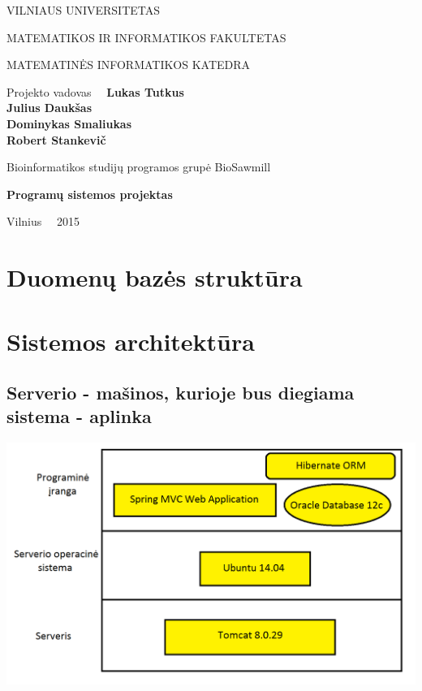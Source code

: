 \documentclass[a4paper,12pt]{article}
\begin{document}
\graphicspath{ {/} }

\renewcommand{\cftdot}{.}	
\renewcommand{\cftsecleader}{\cftdotfill{\cftdotsep}}

\thispagestyle{empty} %


\begin{center}
 VILNIAUS UNIVERSITETAS 
 
MATEMATIKOS IR INFORMATIKOS FAKULTETAS

MATEMATINĖS INFORMATIKOS KATEDRA

\vspace{4cm}

Projekto vadovas \ \ \textbf{Lukas Tutkus} \\
\textbf{Julius Daukšas} \\
\textbf{Dominykas Smaliukas} \\
\textbf{Robert Stankevič} \\

\vspace{0.2cm}

Bioinformatikos studijų programos grupė BioSawmill



\vspace{3cm}
\textbf{\Large Programų sistemos projektas}\\


\vfill

Vilnius \ \  2015
\end{center}



\clearpage

\tableofcontents
\clearpage

\section{Duomenų bazės struktūra}


\section{Sistemos architektūra}
\subsection{Serverio - mašinos, kurioje bus diegiama sistema - aplinka}
\hspace{-1cm}
\includegraphics[scale=0.5]{architektura1}
\end{document}
